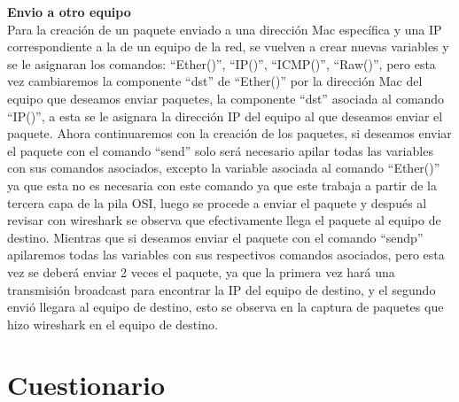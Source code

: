 \documentclass{udpreport}
\begin{document}
		{\bf Envio a otro equipo}\\
		Para la creación de un paquete enviado a una dirección Mac específica y una IP correspondiente a la de un equipo de la red, se vuelven a crear nuevas variables y se le asignaran los comandos: “Ether()”, “IP()”, “ICMP()”, “Raw()”, pero esta vez cambiaremos la componente “dst” de “Ether()” por la dirección Mac del equipo que deseamos enviar paquetes, la componente “dst” asociada al comando “IP()”, a esta se le asignara la dirección IP del equipo al que  deseamos enviar el paquete. Ahora continuaremos con la creación de los paquetes, si deseamos enviar el paquete con el comando “send” solo será necesario apilar todas las variables con sus comandos asociados, excepto la variable asociada al comando “Ether()” ya que esta no es necesaria con este comando ya que este trabaja a partir de la tercera capa de la pila OSI, luego se procede a enviar el paquete y  después al revisar con wireshark se observa que efectivamente llega el paquete al equipo de destino. Mientras que si deseamos enviar el paquete con el comando “sendp” apilaremos todas las variables con sus respectivos comandos asociados,  pero esta vez se deberá enviar 2 veces el paquete, ya que la primera vez hará una transmisión broadcast para encontrar la IP del equipo de destino, y el segundo envió llegara al equipo de destino, esto se observa en la captura de paquetes que hizo wireshark en el equipo de destino.\\
		
	\section{Cuestionario}
	
\end{document}
